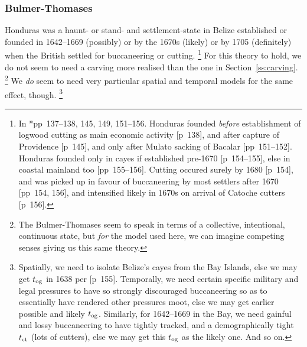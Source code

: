 		\subsubsection{Bulmer-Thomases}
		Honduras was a haunt- or stand- and settlement-state in Belize established or founded in 1642--1669 (possibly) or by the 1670s (likely) or by 1705 (definitely) when the British settled for buccaneering or cutting.%
		\footnote{In \cite{bul16}*{pp~137--138, 145, 149, 151--156}. Honduras founded \emph{before} establishment of logwood cutting as main economic activity [p~138], and after capture of Providence [p~145], and only after Mulato sacking of Bacalar [pp~151--152]. Honduras founded only in cayes if established pre-1670 [p~154--155], else in coastal mainland too [pp~155--156]. Cutting occured surely by 1680 [p~154], and was picked up in favour of buccaneering by most settlers after 1670 [pp~154, 156], and intensified likely in 1670s on arrival of Catoche cutters [p~156].}
		For this theory to hold, we do not seem to need a carving more realised than the one in Section~\ref{ss:carving}.%
		\footnote{The Bulmer-Thomases seem to speak in terms of a collective, intentional, continuous state, but \emph{for} the model used here, we can imagine competing senses giving us this same theory.} %
		We \emph{do} seem to need very particular spatial and temporal models for the same effect, though.%
		\footnote{Spatially, we need to isolate Belize's cayes from the Bay Islands, else we may get \(t_{\operatorname{og}}\) in 1638 per [p~155]. Temporally, we need certain specific military and legal pressures to have so strongly discouraged buccaneering so as to essentially have rendered other pressures moot, else we may get earlier possible and likely \(t_{\operatorname{og}}\). Similarly, for 1642--1669 in the Bay, we need gainful and lossy buccaneering to have tightly tracked, and a demographically tight \(t_{\operatorname{ct}}\) (lots of cutters), else we may get this \(t_{\operatorname{og}}\) as the likely one. And so on.} %
		
